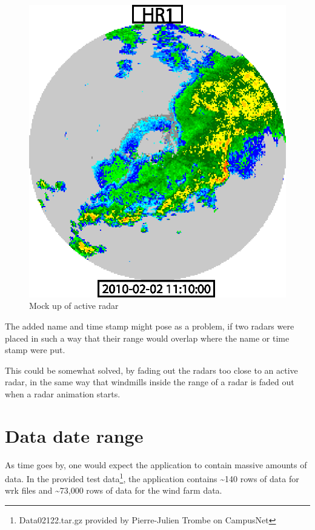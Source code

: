 \begin{figure}[htbp]
\begin{minipage}[b]{0.5\linewidth}
    \includegraphics[width=\linewidth]{figure/radar2.eps}
    \caption{Mock up of active radar}
    \label{fig:mock_up_active_radar}
  \end{minipage}
\end{figure}
The added name and time stamp might pose as a problem, if two radars were placed in such a way that their range would overlap where the name or time stamp were put.

This could be somewhat solved, by fading out the radars too close to an active radar, in the same way that windmills inside the range of a radar is faded out when a radar animation starts.

\section{Data date range}
As time goes by, one would expect the application to contain massive amounts of data.
In the provided test data\footnote{Data02122.tar.gz provided by Pierre-Julien Trombe on CampusNet}, the application contains \textasciitilde 140 rows of data for \textsf{wrk} files and \textasciitilde 73,000 rows of data for the wind farm data.

